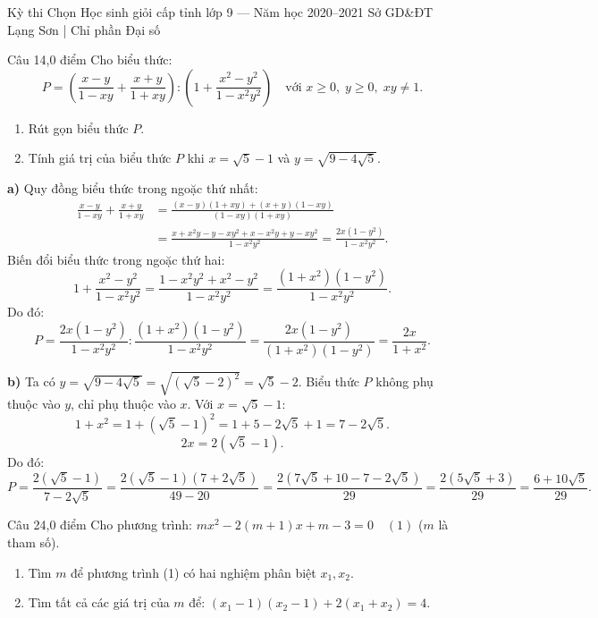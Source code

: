﻿%
%
  {Kỳ thi Chọn Học sinh giỏi cấp tỉnh lớp 9 — Năm học 2020--2021}%
  {Sở GD\&ĐT Lạng Sơn | Chỉ phần Đại số}

\begin{de_cau}{Câu 1}{4,0 điểm}
Cho biểu thức:
\[P = \left(\dfrac{x-y}{1-xy} + \dfrac{x+y}{1+xy}\right) : \left(1 + \dfrac{x^2-y^2}{1-x^2 y^2}\right) \quad \text{với } x \ge 0,\; y \ge 0,\; xy \neq 1.\]
\begin{enumerate}[label=\alph*)]
\item Rút gọn biểu thức $P$.
\item Tính giá trị của biểu thức $P$ khi $x = \sqrt{5}-1$ và $y = \sqrt{9 - 4\sqrt{5}}$.
\end{enumerate}
\end{de_cau}

\begin{loi_giai_cau}
\textbf{a)} Quy đồng biểu thức trong ngoặc thứ nhất:
\begin{align*}
\frac{x-y}{1-xy} + \frac{x+y}{1+xy} &= \frac{(x-y)(1+xy) + (x+y)(1-xy)}{(1-xy)(1+xy)} \\
&= \frac{x + x^2 y - y - xy^2 + x - x^2 y + y - xy^2}{1 - x^2 y^2} = \frac{2x(1-y^2)}{1-x^2 y^2}.
\end{align*}
Biến đổi biểu thức trong ngoặc thứ hai:
\[1 + \frac{x^2-y^2}{1-x^2 y^2} = \frac{1-x^2 y^2 + x^2 - y^2}{1-x^2 y^2} = \frac{(1+x^2)(1-y^2)}{1-x^2 y^2}.\]
Do đó:
\[P = \frac{2x(1-y^2)}{1-x^2 y^2} : \frac{(1+x^2)(1-y^2)}{1-x^2 y^2} = \frac{2x(1-y^2)}{(1+x^2)(1-y^2)} = \boxed{\frac{2x}{1+x^2}}.\]

\textbf{b)} Ta có $y = \sqrt{9 - 4\sqrt{5}} = \sqrt{(\sqrt{5}-2)^2} = \sqrt{5}-2$.
Biểu thức $P$ không phụ thuộc vào $y$, chỉ phụ thuộc vào $x$.
Với $x = \sqrt{5}-1$:
\[1 + x^2 = 1 + (\sqrt{5}-1)^2 = 1 + 5 - 2\sqrt{5} + 1 = 7 - 2\sqrt{5}.\]
\[2x = 2(\sqrt{5}-1).\]
Do đó:
\[P = \frac{2(\sqrt{5}-1)}{7 - 2\sqrt{5}} = \frac{2(\sqrt{5}-1)(7+2\sqrt{5})}{49 - 20} = \frac{2(7\sqrt{5}+10-7-2\sqrt{5})}{29} = \frac{2(5\sqrt{5}+3)}{29} = \boxed{\frac{6+10\sqrt{5}}{29}}.\]
\end{loi_giai_cau}

\begin{de_cau}{Câu 2}{4,0 điểm}
Cho phương trình: $mx^2 - 2(m+1)x + m - 3 = 0 \quad (1)$ ($m$ là tham số).
\begin{enumerate}[label=\alph*)]
\item Tìm $m$ để phương trình (1) có hai nghiệm phân biệt $x_1, x_2$.
\item Tìm tất cả các giá trị của $m$ để: $(x_1-1)(x_2-1) + 2(x_1+x_2) = 4$.
\end{enumerate}
\end{de_cau}

